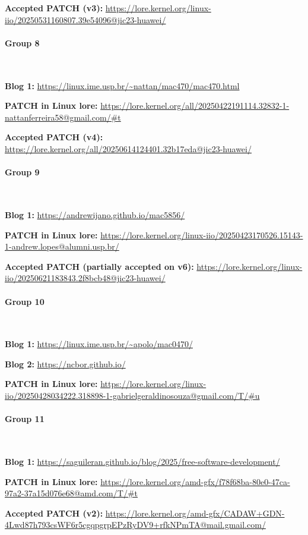 \textbf{Accepted PATCH (v3):} \url{https://lore.kernel.org/linux-iio/20250531160807.39e54096@jic23-huawei/}

\paragraph{Group 8}

\

\textbf{Blog 1:} \url{https://linux.ime.usp.br/~nattan/mac470/mac470.html}

\textbf{PATCH in Linux lore:} \url{https://lore.kernel.org/all/20250422191114.32832-1-nattanferreira58@gmail.com/#t}

\textbf{Accepted PATCH (v4):} \url{https://lore.kernel.org/all/20250614124401.32b17eda@jic23-huawei/}

\paragraph{Group 9}

\

\textbf{Blog 1:} \url{https://andrewijano.github.io/mac5856/}

\textbf{PATCH in Linux lore:} \url{https://lore.kernel.org/linux-iio/20250423170526.15143-1-andrew.lopes@alumni.usp.br/}

\textbf{Accepted PATCH (partially accepted on v6):} \url{https://lore.kernel.org/linux-iio/20250621183843.2f8bcb48@jic23-huawei/}

\paragraph{Group 10}

\

\textbf{Blog 1:} \url{https://linux.ime.usp.br/~apolo/mac0470/}

\textbf{Blog 2:} \url{https://ncbor.github.io/}

\textbf{PATCH in Linux lore:} \url{https://lore.kernel.org/linux-iio/20250428034222.318898-1-gabrielgeraldinosouza@gmail.com/T/#u}

\paragraph{Group 11}

\

\textbf{Blog 1:} \url{https://saguileran.github.io/blog/2025/free-software-development/}

\textbf{PATCH in Linux lore:} \url{https://lore.kernel.org/amd-gfx/f78f68ba-80e0-47ca-97a2-37a15d076e68@amd.com/T/#t}

\textbf{Accepted PATCH (v2):} \url{https://lore.kernel.org/amd-gfx/CADAW+GDN-4Lwd87h793csWF6r5cgqpgrpEPzRyDV9+rfkNPmTA@mail.gmail.com/}
